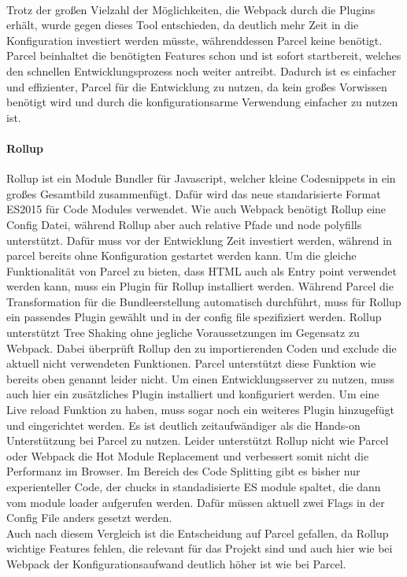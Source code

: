 \\
Trotz der großen Vielzahl der Möglichkeiten, die Webpack durch die Plugins erhält, wurde gegen dieses Tool entschieden, da deutlich mehr Zeit in die Konfiguration investiert werden müsste, währenddessen Parcel keine benötigt. Parcel beinhaltet die benötigten Features schon und ist sofort startbereit, welches den schnellen Entwicklungsprozess noch weiter antreibt. Dadurch ist es einfacher und effizienter, Parcel für die Entwicklung zu nutzen, da kein großes Vorwissen benötigt wird und durch die konfigurationsarme Verwendung einfacher zu nutzen ist.

\paragraph{Rollup}Rollup ist ein Module Bundler für Javascript, welcher kleine Codesnippets in ein großes Gesamtbild zusammenfügt. Dafür wird das neue standarisierte Format ES2015 für Code Modules verwendet. Wie auch Webpack benötigt Rollup eine Config Datei, während Rollup aber auch relative Pfade und node polyfills unterstützt. Dafür muss vor der Entwicklung Zeit investiert werden, während in parcel bereits ohne Konfiguration gestartet werden kann. Um die gleiche Funktionalität von Parcel zu bieten, dass HTML auch als Entry point verwendet werden kann, muss ein Plugin für Rollup installiert werden. Während Parcel die Transformation für die Bundleerstellung automatisch durchführt, muss für Rollup ein passendes Plugin gewählt und in der config file spezifiziert werden.  Rollup unterstützt Tree Shaking ohne jegliche Voraussetzungen im Gegensatz zu Webpack. Dabei überprüft Rollup den zu importierenden Coden und exclude die aktuell nicht verwendeten Funktionen. Parcel unterstützt diese Funktion wie bereits oben genannt leider nicht. Um einen Entwicklungsserver zu nutzen, muss auch hier ein zusätzliches Plugin installiert und konfiguriert werden. Um eine Live reload Funktion zu haben, muss sogar noch ein weiteres Plugin hinzugefügt und eingerichtet werden. Es ist deutlich zeitaufwändiger als die Hands-on Unterstützung bei Parcel zu nutzen. Leider unterstützt Rollup nicht wie Parcel oder Webpack die Hot Module Replacement und verbessert somit nicht die Performanz im Browser. Im Bereich des Code Splitting gibt es bisher nur experienteller Code, der chucks in standadisierte ES module spaltet, die dann vom module loader aufgerufen werden. Dafür müssen aktuell zwei Flags in der Config File anders gesetzt werden.
\\
Auch nach diesem Vergleich ist die Entscheidung auf Parcel gefallen, da Rollup wichtige Features fehlen, die relevant für das Projekt sind und auch hier wie bei Webpack der Konfigurationsaufwand deutlich höher ist wie bei Parcel.

